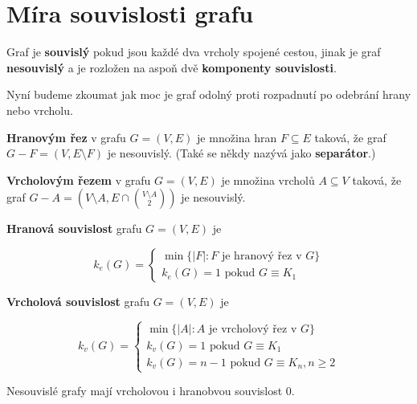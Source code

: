\chapter{Míra souvislosti grafu}

\begin{definice}
	Graf je \textbf{souvislý} pokud jsou každé dva vrcholy spojené cestou, jinak je graf \textbf{nesouvislý} a je rozložen na aspoň dvě \textbf{komponenty souvislosti}.
\end{definice}

Nyní budeme zkoumat jak moc je graf odolný proti rozpadnutí po odebrání hrany nebo vrcholu.

\begin{definice}
	\textbf{Hranovým řez} v grafu $G = (V,E)$ je množina hran $F \subseteq E$ taková, že graf $G - F = (V, E \setminus F)$ je nesouvislý. (Také se někdy nazývá jako \textbf{separátor}.)
\end{definice}

\begin{definice}
	\textbf{Vrcholovým řezem} v grafu $G = (V,E)$ je množina vrcholů $A \subseteq V$ taková, že graf $G - A = (V \setminus A, E \cap \binom{V \setminus A}{2})$ je nesouvislý.
\end{definice}

\begin{definice}
	\textbf{Hranová souvislost} grafu $G = (V,E)$ je
	
	$$
	k_{e}(G) =
	\left\{
	\begin{array}{ll}
		\min\{|F|: F \text{ je hranový řez v }G \} \\
		k_{e}(G) = 1 \text{ pokud } G \equiv K_{1}
	\end{array}
	\right.
	$$
\end{definice}

\begin{definice}
	\textbf{Vrcholová souvislost} grafu $G = (V,E)$ je
	
	$$
	k_{v}(G) =
	\left\{
	\begin{array}{ll}
		\min\{|A|: A \text{ je vrcholový řez v }G \} \\ 
		k_{v}(G) = 1 \text{ pokud } G \equiv K_{1} \\
		k_{v}(G) = n-1 \text{ pokud } G \equiv K_{n}, n \geq 2
	\end{array}
	\right.
	$$
\end{definice}

Nesouvislé grafy mají vrcholovou i hranobvou souvislost 0. 

